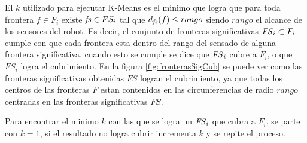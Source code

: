 El $k$ utilizado para ejecutar K-Means es el minimo que logra que para toda
frontera $f\in F_i$ existe $\mathit{fs} \in FS_i$ tal que $d_{\mathit{fs}}(f) \leq
rango$ siendo $rango$ el alcance de los sensores del robot. Es decir, el
conjunto de fronteras significativas $\mathit{FS}_i \subset F_i$ cumple con que
cada frontera esta dentro del rango del sensado de alguna frontera
significativa, cuando esto se cumple se dice que $\mathit{FS}_i$ cubre a $F_i$, o
que $FS_i$ logra el cubrimiento. En la figura \ref{fig:fronterasSigCub} se
puede ver como las fronteras significativas obtenidas $FS$ logran el
cubrimiento, ya que todas los centros de las fronteras $F$ estan contenidos en
las circunferencias de radio $rango$ centradas en las fronteras significativas
$FS$.

Para encontrar el minimo $k$ con las que se logra un $\mathit{FS}_i$ que cubra a
$F_i$, se parte con $k=1$, si el resultado no logra cubrir incrementa $k$ y se
repite el proceso.


